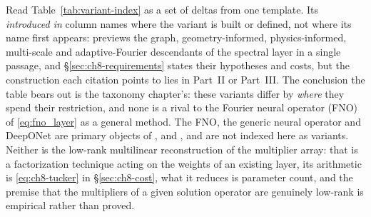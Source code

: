 Read Table~\ref{tab:variant-index} as a set of deltas from one template. Its
\emph{introduced in} column names where the variant is built or defined, not where its
name first appears: 
previews the graph, geometry-informed, physics-informed, multi-scale and adaptive-Fourier
descendants of the spectral layer in a single passage, and
\S\ref{sec:ch8-requirements} states their hypotheses and costs, but the construction each
citation points to lies in Part~II or Part~III. The conclusion the table bears out is the
taxonomy chapter's: these variants differ by \emph{where} they spend their restriction, and
none is a rival to the Fourier neural operator (FNO) of \eqref{eq:fno_layer} as a general
method. The FNO, the generic neural operator and DeepONet are primary objects of
,
 and
, and are not indexed here as
variants. Neither is the low-rank multilinear reconstruction of the multiplier array: that is
a factorization technique acting on the weights of an existing layer, its arithmetic is
\eqref{eq:ch8-tucker} in \S\ref{sec:ch8-cost}, what it reduces is parameter count, and the
premise that the multipliers of a given solution operator are genuinely low-rank is empirical
rather than proved.

